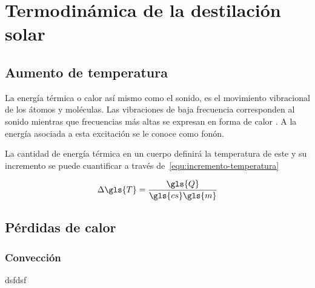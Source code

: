  \section{Termodinámica de la destilación solar}
	
	\subsection{Aumento de temperatura}
		
		La energía térmica o calor así mismo como el sonido, es el movimiento vibracional de los átomos y moléculas. Las vibraciones de baja frecuencia corresponden al sonido mientras que frecuencias más altas se expresan en forma de calor \cite{chandler_explained_2010}. A la energía asociada a esta excitación se le conoce como fonón.
		
		La cantidad de energía térmica en un cuerpo definirá la temperatura de este y su incremento se puede cuantificar a través de~\eqref{equ:incremento-temperatura}
		
		\begin{equation}
			\label{equ:incremento-temperatura}
			\Delta\gls{T} = \dfrac{\gls{Q}}{\gls{cs}\gls{m}}
		\end{equation}
	
	\subsection{Pérdidas de calor}
		
		\subsubsection{Convección}
			dsfdsf
		
